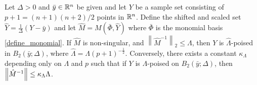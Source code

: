 \documentclass{article}
\begin{document}
\begin{theorem} \label{scale_the_radius}
\label{Lambda_poised_error_bounds_delta}
Let $\Delta >0$ and $\bar{y} \in \mathbb R^n$ be given and  let $Y$ be a sample set consisting of $p+1=(n+1)(n+2)/2$ points in  $\mathbb R^n$.    Define the shifted and scaled set $\hat{Y} = \frac{1}{\Delta} \left(Y-\bar{y}\right)$ and let $\hat{M}=M(\bar{\Phi},\hat{Y})$ where $\bar{\Phi}$ is the monomial basis \cref{define_monomial}.
If $\hat{M}$ is non-singular, and $\left\|{\hat{M}^{-1}}\right\|_2 \le \Lambda$, then $Y$ is $\hat{\Lambda}$-poised in $B_2(\bar{y};\Delta)$,
where $\hat{\Lambda} = \Lambda \left(p+1\right)^{-\frac 1 2}$.  Conversely,  there exists a constant $\kappa_\Lambda$ depending only on $\Lambda$ and $p$ such that if $Y$ is $\Lambda$-poised on $B_2(\bar{y};\Delta)$, then ${\left\|\hat{M}^{-1}\right\|} \le \kappa_{\Lambda} \Lambda$.
\end{theorem}


%
%
%
\end{document}

